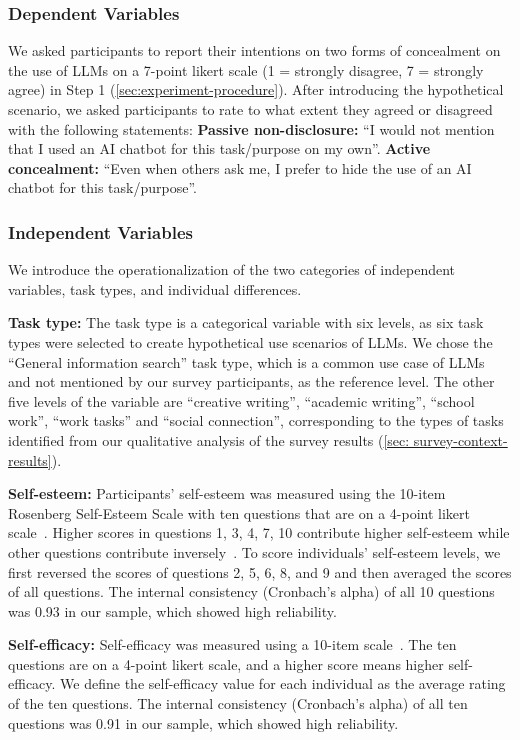 \subsubsection{Dependent Variables}
\label{sec:experiemnt-operationalization-dep-var}
We asked participants to report their intentions on two forms of concealment on the use of LLMs on a 7-point likert scale (1 = strongly disagree, 7 = strongly agree) in Step 1 (\autoref{sec:experiment-procedure}).
After introducing the hypothetical scenario, we asked participants to rate to what extent they agreed or disagreed with the following statements:
\textbf{Passive non-disclosure: }``I would not mention that I used an AI chatbot for this task/purpose on my own''.
\textbf{Active concealment: }``Even when others ask me, I prefer to hide the use of an AI chatbot for this task/purpose''.

\subsubsection{Independent Variables}
We introduce the operationalization of the two categories of independent variables, task types, and individual differences.


\textbf{Task type:} 
The task type is a categorical variable with six levels, as six task types were selected to create hypothetical use scenarios of LLMs.
We chose the ``General information search'' task type, which is a common use case of LLMs~\cite{zhang2024s} and not mentioned by our survey participants, as the reference level. 
The other five levels of the variable are ``creative writing'', ``academic writing'', ``school work'', ``work tasks'' and ``social connection'', corresponding to the types of tasks identified from our qualitative analysis of the survey results (\autoref{sec: survey-context-results}).

\textbf{Self-esteem:}
Participants’ self-esteem was measured using the 10-item Rosenberg Self-Esteem Scale with ten questions that are on a 4-point likert scale~\cite{rosenberg1965rosenberg}. 
Higher scores in questions 1, 3, 4, 7, 10 contribute higher self-esteem while other questions contribute inversely~\cite{rosenberg1965rosenberg}. 
To score individuals' self-esteem levels, we first reversed the scores of questions 2, 5, 6, 8, and 9 and then averaged the scores of all questions.
The internal consistency (Cronbach’s alpha) of all 10 questions was 0.93 in our sample, which showed high reliability.

\textbf{Self-efficacy:}
Self-efficacy was measured using a 10-item scale~\cite{schwarzer1995generalized}.
The ten questions are on a 4-point likert scale, and a higher score means higher self-efficacy. 
We define the self-efficacy value for each individual as the average rating of the ten questions.
The internal consistency (Cronbach’s alpha) of all ten questions was 0.91 in our sample, which showed high reliability.

